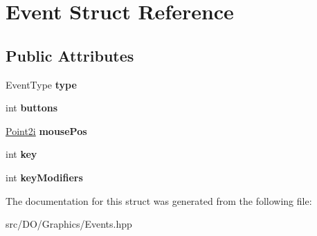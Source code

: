 \hypertarget{struct_d_o_1_1_event}{\section{Event Struct Reference}
\label{struct_d_o_1_1_event}
}
\subsection*{Public Attributes}
\begin{DoxyCompactItemize}
\item 
\hypertarget{group___event_ga2f18e60350b641236ab0e724d0622d1d}{Event\-Type {\bfseries type}}\label{group___event_ga2f18e60350b641236ab0e724d0622d1d}

\item 
\hypertarget{group___event_gab25f60de6d1c5f370231402aa1097c95}{int {\bfseries buttons}}\label{group___event_gab25f60de6d1c5f370231402aa1097c95}

\item 
\hypertarget{group___event_ga5ab63f7168dcb5a7a76af31f43f13018}{\hyperlink{group___eigen_typedefs_ga048a27763e58f682b1b91af86144f701}{Point2i} {\bfseries mouse\-Pos}}\label{group___event_ga5ab63f7168dcb5a7a76af31f43f13018}

\item 
\hypertarget{group___event_ga35af0be900467fedbb610bd6ea65ed78}{int {\bfseries key}}\label{group___event_ga35af0be900467fedbb610bd6ea65ed78}

\item 
\hypertarget{group___event_gad17583f4b163df5f7e7b9e55883c5314}{int {\bfseries key\-Modifiers}}\label{group___event_gad17583f4b163df5f7e7b9e55883c5314}

\end{DoxyCompactItemize}


The documentation for this struct was generated from the following file\-:\begin{DoxyCompactItemize}
\item 
src/\-D\-O/\-Graphics/Events.\-hpp\end{DoxyCompactItemize}
